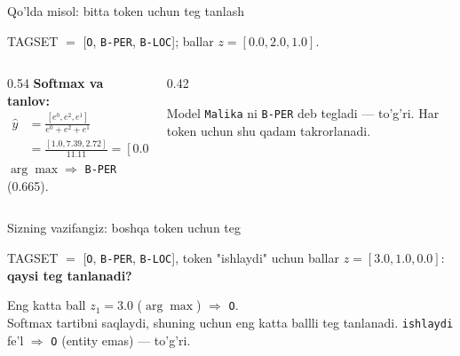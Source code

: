 \documentclass[aspectratio=169,11pt]{beamer}
\begin{document}
\begin{frame}{Qo'lda misol: bitta token uchun teg tanlash}
  \begin{tcolorbox}[defbox,title={Token "Malika" uchun teg ballari (3 teg)}]
    \small TAGSET $=$ [\texttt{O}, \texttt{B-PER}, \texttt{B-LOC}]; ballar $z=[0.0, 2.0, 1.0]$.
  \end{tcolorbox}
  \vspace{0.2em}
  \begin{columns}[T]
    \begin{column}{0.54\textwidth}
      \textbf{Softmax va tanlov:}
      \begin{align*}
        \hat{y} &= \tfrac{[e^0, e^2, e^1]}{e^0+e^2+e^1}\\
          &= \tfrac{[1.0, 7.39, 2.72]}{11.11} = [0.090, 0.665, 0.245]
      \end{align*}
      $\arg\max \Rightarrow$ \texttt{B-PER} (0.665).
    \end{column}
    \begin{column}{0.42\textwidth}
      \begin{tcolorbox}[okbox,top=2pt,bottom=2pt]
        \footnotesize
        Model \texttt{Malika} ni \texttt{B-PER} deb tegladi --- to'g'ri. Har token
        uchun shu qadam takrorlanadi.
      \end{tcolorbox}
    \end{column}
  \end{columns}
\end{frame}

\begin{frame}{Sizning vazifangiz: boshqa token uchun teg}
  \begin{tcolorbox}[warnbox,title=Savol --- 60 soniya]
    \small
    TAGSET $=$ [\texttt{O}, \texttt{B-PER}, \texttt{B-LOC}], token "ishlaydi" uchun
    ballar $z=[3.0, 1.0, 0.0]$:\\[4pt]
    \textbf{\large qaysi teg tanlanadi?}
  \end{tcolorbox}
  \pause
  \begin{tcolorbox}[okbox,title=Javob]
    \small
    Eng katta ball $z_1=3.0$ ($\arg\max$) $\Rightarrow$ \texttt{O}.\\[3pt]
    \footnotesize Softmax tartibni saqlaydi, shuning uchun eng katta ballli teg
    tanlanadi. \texttt{ishlaydi} fe'l $\Rightarrow$ \texttt{O} (entity emas) --- to'g'ri.
  \end{tcolorbox}
\end{frame}
\end{document}
